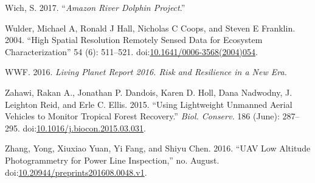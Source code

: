 \documentclass[]{interact}
\theoremstyle{plain}%
\theoremstyle{definition}
\theoremstyle{remark}
\begin{document}
\hypertarget{ref-WichS2017}{}
Wich, S. 2017. ``\emph{Amazon River Dolphin Project}.''

\hypertarget{ref-wulder_high_2004}{}
Wulder, Michael A, Ronald J Hall, Nicholas C Coops, and Steven E
Franklin. 2004. ``High Spatial Resolution Remotely Sensed Data for
Ecosystem Characterization'' 54 (6): 511--521.
doi:\href{https://doi.org/10.1641/0006-3568(2004)054}{10.1641/0006-3568(2004)054}.

\hypertarget{ref-wwf_living_2016}{}
WWF. 2016. \emph{Living Planet Report 2016. Risk and Resilience in a New
Era.}

\hypertarget{ref-zahawi_using_2015}{}
Zahawi, Rakan A., Jonathan P. Dandois, Karen D. Holl, Dana Nadwodny, J.
Leighton Reid, and Erle C. Ellis. 2015. ``Using Lightweight Unmanned
Aerial Vehicles to Monitor Tropical Forest Recovery.'' \emph{Biol.
Conserv.} 186 (June): 287--295.
doi:\href{https://doi.org/10.1016/j.biocon.2015.03.031}{10.1016/j.biocon.2015.03.031}.

\hypertarget{ref-zhang_uav_2016}{}
Zhang, Yong, Xiuxiao Yuan, Yi Fang, and Shiyu Chen. 2016. ``UAV Low
Altitude Photogrammetry for Power Line Inspection,'' no. August.
doi:\href{https://doi.org/10.20944/preprints201608.0048.v1}{10.20944/preprints201608.0048.v1}.

\newpage
\singlespacing 
\end{document}
